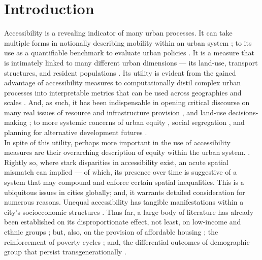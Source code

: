 \section{Introduction}
Accessibility is a revealing indicator of many urban processes. It can take multiple forms in notionally describing mobility within an urban system \citep{muraco1972intraurban,vickerman1974accessibility}; to its use as a quantifiable benchmark to evaluate urban policies \citep{paez2012measuring,masucci2013gravity,piovani2018measuring, yang2019comprehensive}. It is a measure that is intimately linked to many different urban dimensions --- its land-use, transport structures, and resident populations \citep{miller2018accessibility}. Its utility is evident from the gained advantage of accessibility measures to computationally distil complex urban processes into interpretable metrics that can be used across geographies and scales \citep{bhat2000development}. And, as such, it has been indispensable in opening critical discourse on many real issues of resource and infrastructure provision \citep{van1999accessibility}, and land-use decisions-making \citep{tsou2005accessibility,sa2006does,cheng2013measuring, brondeel2014use}; to more systemic concerns of urban equity \citep{van1999accessibility, curl2011does}, social segregation \citep{massey1988dimensions,arapoglou2009new,li2013residential}, and planning for alternative development futures \citep{cervero1997paradigm, geurs2012accessibility}.\\

In spite of this utility, perhaps more important in the use of accessibility measures are their overarching description of equity within the urban system. \citep{hansen1959accessibility,nelson1993assessing,ihlanfeldt1994spatial}. Rightly so, where stark disparities in accessibility exist, an acute spatial mismatch can implied \citep{kain1992spatial,nelson1993assessing,ihlanfeldt1994spatial,gobillon2007mechanisms} --- of which, its presence over time is suggestive of a system that may compound and enforce certain spatial inequalities. This is a ubiquitous issues in cities globally; and, it warrants detailed consideration for numerous reasons. Unequal accessibility has tangible manifestations within a city's socioeconomic structures \citep{kain1992spatial}. Thus far, a large body of literature has already been established on its disproportionate effect, not least, on low-income and ethnic groups \citep{kain1992spatial}; but, also, on the provision of affordable housing \citep{hillier2003spatial,dujardin2005neighborhood}; the reinforcement of poverty cycles \citep{gobillon2007mechanisms,aaslund2010important}; and, the differential outcomes of demographic group that persist transgenerationally \citep{cervero1995job}.\\

